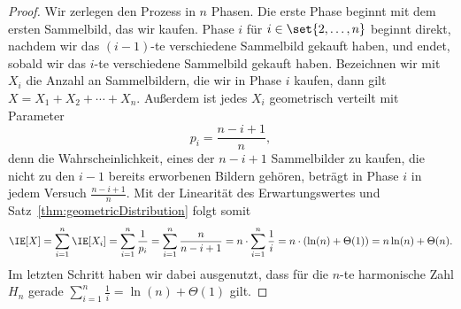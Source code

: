 \documentclass[language=ngerman,algolist]{TemplateLecture}
\begin{document}
\begin{proof}
    Wir zerlegen den Prozess in $n$ Phasen. Die erste Phase beginnt mit dem ersten Sammelbild, das wir kaufen. Phase $i$ für $i \in \set{2,\ldots,n}$ beginnt direkt, nachdem wir das $(i-1)$-te verschiedene Sammelbild gekauft haben, und endet, sobald wir das $i$-te verschiedene Sammelbild gekauft haben. Bezeichnen wir mit $X_i$ die Anzahl an Sammelbildern, die wir in Phase $i$ kaufen, dann gilt $X = X_1 + X_2 + \cdots + X_n$. Außerdem ist jedes $X_i$ geometrisch verteilt mit Parameter 
    \begin{equation*}
        p_i = \frac{n-i+1}{n},
    \end{equation*}
    denn die Wahrscheinlichkeit, eines der $n-i+1$ Sammelbilder zu kaufen, die nicht zu den $i-1$ bereits erworbenen Bildern gehören, beträgt in Phase $i$ in jedem Versuch $\frac{n-i+1}{n}$. Mit der Linearität des Erwartungswertes und Satz~\ref{thm:geometricDistribution} folgt somit
    \begin{equation*}
        \IE[X] = \sum_{i=1}^n \IE[X_i] = \sum_{i=1}^n \frac{1}{p_i} = \sum_{i=1}^n \frac{n}{n-i+1} = n \cdot \sum_{i=1}^n \frac{1}{i} = n \cdot ( \ln(n) + \Theta(1) ) = n\ln(n) + \Theta(n).
    \end{equation*}
    Im letzten Schritt haben wir dabei ausgenutzt, dass für die $n$-te harmonische Zahl $H_n$ gerade $\sum_{i=1}^n \frac{1}{i} = \ln(n) + \Theta(1)$ gilt.
\end{proof}

\end{document}
